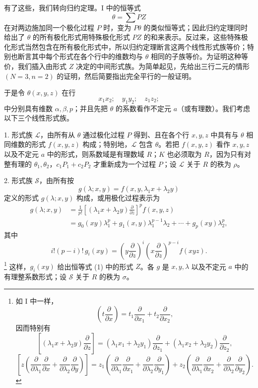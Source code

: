 有了这些，我们转向归约定理。I 中的恒等式
\[
  \theta=\sum PZ
\]
在对两边施加同一个极化过程 $P$ 时，变为 $P\theta$ 的类似恒等式；因此归约定理同时给出了 $\theta$ 的所有极化形式用特殊极化形式 $PZ$ 的和来表示。反过来，这些特殊极化形式当然包含在所有极化形式中，所以归约定理断言这两个线性形式族等价；特别也断言其中每个形式在各个行中的维数均与 $\theta$ 相同的子族等价。为证明这种等价，我们插入由形式 $Z$ 决定的中间形式族。为简单起见，先给出三行二元的情形 $(N=3,n=2)$ 的证明，然后简要指出完全平行的一般证明。

于是令 $\theta(x,y,z)$ 在行
\[
  x_1x_2;\quad y_1y_2;\quad z_1z_2;
\]
中分别具有维数 $\alpha,\beta,p$；并且先把 $\theta$ 的系数看作不定元 $a$（或有理数）。我们考虑以下三个线性形式族。

1. 形式族 $\mathcal L$，由所有从 $\theta$ 通过极化过程 $P$ 得到、且在各个行 $x,y,z$ 中具有与 $\theta$ 相同维数的形式 $f(x,y,z)$ 构成；特别地，$\mathcal L$ 包含 $\theta$。若把 $f(x,y,z)$ 看作 $x,y,z$ 以及不定元 $a$ 中的形式，则系数域是有理数域 $R$；$K$ 也必须取为 $R$，因为只有对整有理的 $\theta_1,\theta_2$，$c_1P_1+c_2P_2$ 才重新成为一个过程 $P$；设 $\mathcal L$ 关于 $R$ 的秩为 $\rho$。

2. 形式族 $\mathcal S$，由所有按
\[
  g(\lambda;x,y)=f(x,y,\lambda_1x+\lambda_2y)
\]
定义的形式 $g(\lambda;x,y)$ 构成，或用极化过程表示为
\[
\begin{aligned}
  g(\lambda;x,y)
  &=\frac1{p!}\left[(\lambda_1x+\lambda_2y)\frac{\partial}{\partial z}\right]^p f(x,y,z) \\
  &=g_0(xy)\lambda_1^p+g_1(x,y)\lambda_1^{p-1}\lambda_2+\cdots+g_p(xy)\lambda_2^p,
\end{aligned}
\]
其中
\[
  i!(p-i)!\,g_i(xy)=
  \left(y\frac{\partial}{\partial z}\right)^i
  \left(x\frac{\partial}{\partial z}\right)^{p-i}f(xyz).
\]
\footnote{如 I 中一样，
\[
 \left(t\frac{\partial}{\partial x}\right)=t_1\frac{\partial}{\partial x_1}+t_2\frac{\partial}{\partial x_2},
\]
因而特别有
\[
 \left[(\lambda_1x+\lambda_2y)\frac{\partial}{\partial z}\right]
 = (\lambda_1x_1+\lambda_2y_1)\frac{\partial}{\partial z_1}
 + (\lambda_1x_2+\lambda_2y_2)\frac{\partial}{\partial z_2},
\]
\[
 \left[z\left(\frac{\partial}{\partial\lambda_1}\frac{\partial}{\partial x}
 +\frac{\partial}{\partial\lambda_2}\frac{\partial}{\partial y}\right)\right]
 =z_1\left(\frac{\partial}{\partial\lambda_1}\frac{\partial}{\partial x_1}
 +\frac{\partial}{\partial\lambda_2}\frac{\partial}{\partial y_1}\right)
 +z_2\left(\frac{\partial}{\partial\lambda_1}\frac{\partial}{\partial x_2}
 +\frac{\partial}{\partial\lambda_2}\frac{\partial}{\partial y_2}\right).
\]}
这样，$g_i(xy)$ 给出恒等式 (1) 中的形式 $Z$。各 $g$ 是 $x,y,\lambda$ 以及不定元 $a$ 中的有理整系数形式；设 $\mathcal S$ 关于 $R$ 的秩为 $\sigma$。

